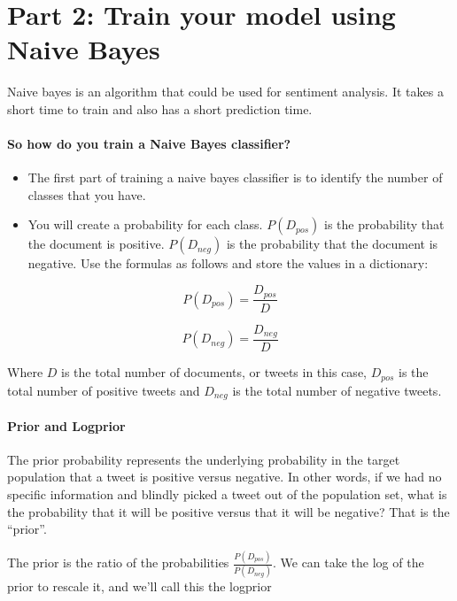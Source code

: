 \documentclass[11pt]{article}
\providecommand{\tightlist}{%
      \setlength{\itemsep}{0pt}\setlength{\parskip}{0pt}}
\begin{document}
    \hypertarget{part-2-train-your-model-using-naive-bayes}{%
\section{Part 2: Train your model using Naive
Bayes}\label{part-2-train-your-model-using-naive-bayes}}

Naive bayes is an algorithm that could be used for sentiment analysis.
It takes a short time to train and also has a short prediction time.

\hypertarget{so-how-do-you-train-a-naive-bayes-classifier}{%
\paragraph{So how do you train a Naive Bayes
classifier?}\label{so-how-do-you-train-a-naive-bayes-classifier}}

\begin{itemize}
\tightlist
\item
  The first part of training a naive bayes classifier is to identify the
  number of classes that you have.
\item
  You will create a probability for each class. \(P(D_{pos})\) is the
  probability that the document is positive. \(P(D_{neg})\) is the
  probability that the document is negative. Use the formulas as follows
  and store the values in a dictionary:
\end{itemize}

\[P(D_{pos}) = \frac{D_{pos}}{D}\tag{1}\]

\[P(D_{neg}) = \frac{D_{neg}}{D}\tag{2}\]

Where \(D\) is the total number of documents, or tweets in this case,
\(D_{pos}\) is the total number of positive tweets and \(D_{neg}\) is
the total number of negative tweets.

    \hypertarget{prior-and-logprior}{%
\paragraph{Prior and Logprior}\label{prior-and-logprior}}

The prior probability represents the underlying probability in the
target population that a tweet is positive versus negative. In other
words, if we had no specific information and blindly picked a tweet out
of the population set, what is the probability that it will be positive
versus that it will be negative? That is the ``prior''.

The prior is the ratio of the probabilities
\(\frac{P(D_{pos})}{P(D_{neg})}\). We can take the log of the prior to
rescale it, and we'll call this the logprior
\end{document}

